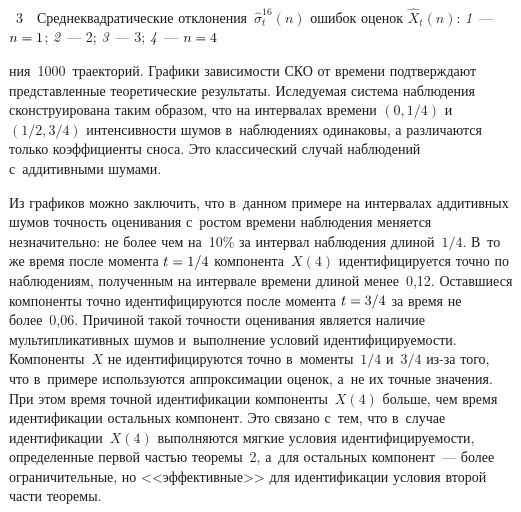 \begin{multicols}{2}


{ \begin{center}  %
 \vspace*{1pt}
 \mbox{%
\epsfxsize=77.371mm
}
\end{center}

\vspace*{-3pt}


\noindent
{{\figurename~3}\ \ \small{Среднеквадратические отклонения~$\widehat{\sigma}^{16}_t(n)$ 
ошибок оценок $\widehat{X}_t(n)$: \textit{1}~--- $n\hm=1$;
\textit{2}~--- 2; \textit{3}~--- 3; \textit{4}~--- $n\hm=4$}}
}

\vspace*{12pt}

\addtocounter{figure}{1}
 


\noindent
ния~1000~траекторий.
Графики зависимости СКО от
 времени подтверждают представленные теоретические 
результаты. Иследуемая система наблюдения сконструирована таким 
образом, что на интервалах времени $(0,{1}/{4})$ и~$({1}/{2},{3}/{4})$ 
интенсивности шумов в~наблюдениях одинаковы, а различаются только коэффициенты сноса.
 Это классический случай
   наблюдений с~аддитивными шумами. 
   
   Из графиков можно 
 заключить, что в~данном примере на интервалах аддитивных шумов точность 
 оценивания
 с~ростом времени наблюдения меняется незначительно: не более 
 чем на~10\% за интервал наблюдения длиной~${1}/{4}$.
В~то же время после момента $t\hm={1}/{4}$ компонента~$X(4)$ идентифицируется точно 
по наблюдениям, полученным на интервале времени длиной менее~0,12. 
Оставшиеся компоненты точно идентифицируются после момента $t\hm={3}/{4}$ 
за время не более~0,06. Причиной такой точности оценивания является наличие
 мультипликативных шумов и~выполнение условий иден\-ти\-фи\-ци\-ру\-емости. Компоненты~$X$ 
 не идентифицируются точно в~моменты~${1}/{4}$ и~${3}/{4}$ из-за того, что в~примере 
 используются аппроксимации оценок, а~не их точные значения. При этом время точной 
 идентификации компоненты~$X(4)$ больше, чем время идентификации остальных компонент. 
 Это связано с~тем, что в~случае идентификации~$X(4)$ выполняются мягкие 
 условия идентифицируемости, определенные первой частью теоремы~2, 
 а~для остальных компонент~--- более ограничительные, но <<эффективные>> для 
 идентификации условия второй части теоремы.


\end{multicols}
